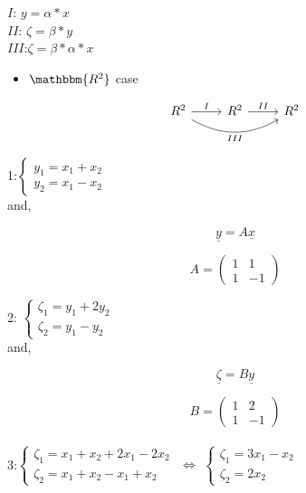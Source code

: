 \documentclass[]{article}
\providecommand{\tightlist}{%
  \setlength{\itemsep}{0pt}\setlength{\parskip}{0pt}}
\begin{document}
\(I\): \(y=\alpha*x\)\\[2\baselineskip] \(II\):
\(\zeta=\beta*y\)\\[2\baselineskip] \(III\):\(\zeta=\beta*\alpha*x\)

\begin{itemize}
\tightlist
\item
  \(\mathbbm{R^2}\) case
\end{itemize}

\[
  \begin{tikzcd}
R^2\ar[r,"I"]\ar[rr,out=-30,in=210,swap,"III"] & R^2\ar[r,"II"] & R^2
\end{tikzcd}
\]

1:\(\begin{cases} y_1 = x_1 + x_2\\ y_2 = x_1 - x_2 \end{cases}\)\\[2\baselineskip]
and,

\begin{equation}\label{eqn:matrix}\underline{y}=A\underline{x}\end{equation}

\[A = \begin{pmatrix} 1 & 1 \\ 1 & -1 \end{pmatrix}\]

2:
\(\begin{cases} \zeta_1= y_1 + 2y_2\\ \zeta_2 = y_1 - y_2 \end{cases}\)\\

and,

\begin{equation}\label{eqn:matrix}\underline{\zeta}=B\underline{y}\end{equation}

\[B = \begin{pmatrix} 1 & 2 \\ 1 & -1 \end{pmatrix}\]\\

3:\(\begin{cases} \zeta_1= x_1 + x_2 + 2x_1 - 2x_2 \\ \zeta_2 = x_1 + x_2 - x_1 + x_2 \end{cases}\)
\(\Longleftrightarrow\)
\(\begin{cases} \zeta_1= 3x_1 - x_2\\ \zeta_2 = 2x_2 \end{cases}\)\\
\end{document}
